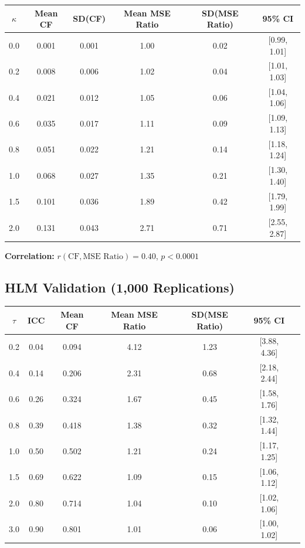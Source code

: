 \documentclass[10pt]{article} %
\theoremstyle{plain}
\theoremstyle{definition}
\begin{document}
\begin{center}
\begin{tabular}{cccccc}
\toprule
$\kappa$ & Mean CF & SD(CF) & Mean MSE Ratio & SD(MSE Ratio) & 95\% CI \\
\midrule
0.0 & 0.001 & 0.001 & 1.00 & 0.02 & [0.99, 1.01] \\
0.2 & 0.008 & 0.006 & 1.02 & 0.04 & [1.01, 1.03] \\
0.4 & 0.021 & 0.012 & 1.05 & 0.06 & [1.04, 1.06] \\
0.6 & 0.035 & 0.017 & 1.11 & 0.09 & [1.09, 1.13] \\
0.8 & 0.051 & 0.022 & 1.21 & 0.14 & [1.18, 1.24] \\
1.0 & 0.068 & 0.027 & 1.35 & 0.21 & [1.30, 1.40] \\
1.5 & 0.101 & 0.036 & 1.89 & 0.42 & [1.79, 1.99] \\
2.0 & 0.131 & 0.043 & 2.71 & 0.71 & [2.55, 2.87] \\
\bottomrule
\end{tabular}
\end{center}

\textbf{Correlation:} $r(\text{CF}, \text{MSE Ratio}) = 0.40$, $p < 0.0001$

\subsection{HLM Validation (1,000 Replications)}

\begin{center}
\begin{tabular}{ccccccc}
\toprule
$\tau$ & ICC & Mean CF & Mean MSE Ratio & SD(MSE Ratio) & 95\% CI \\
\midrule
0.2 & 0.04 & 0.094 & 4.12 & 1.23 & [3.88, 4.36] \\
0.4 & 0.14 & 0.206 & 2.31 & 0.68 & [2.18, 2.44] \\
0.6 & 0.26 & 0.324 & 1.67 & 0.45 & [1.58, 1.76] \\
0.8 & 0.39 & 0.418 & 1.38 & 0.32 & [1.32, 1.44] \\
1.0 & 0.50 & 0.502 & 1.21 & 0.24 & [1.17, 1.25] \\
1.5 & 0.69 & 0.622 & 1.09 & 0.15 & [1.06, 1.12] \\
2.0 & 0.80 & 0.714 & 1.04 & 0.10 & [1.02, 1.06] \\
3.0 & 0.90 & 0.801 & 1.01 & 0.06 & [1.00, 1.02] \\
\bottomrule
\end{tabular}
\end{center}
\end{document}
